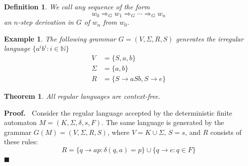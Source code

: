\documentclass[aps,pra,onecolumn,notitlepage,superscriptaddress]{revtex4-1}
\newcommand{\N}{\mathbb{N}}
\newtheorem{theo}{Theorem}
\newtheorem{defi}{Definition}
\newtheorem{exa}{Example}
\def\Proof{{\bf Proof.~}}
\def\qed{$\blacksquare$ \newline}
\begin{document}
    \begin{defi}
        We call any sequence of the form
        \begin{equation}
            w_0 \Rightarrow_G w_1 \Rightarrow_G \cdots \Rightarrow_G w_n
        \end{equation}
        an $n$-step derivation in $G$ of $w_n$ from $w_0$.
    \end{defi}

    \begin{exa}
        The following grammar $G = (V, \Sigma, R, S)$ generates the irregular language $\{a^ib^i : i \in \N\}$
        \begin{align*}
            V &= \{ S,a,b \} \\
            \Sigma &= \{a,b\} \\
            R &= \{ S \to aSb, S \to e \}
        \end{align*}
    \end{exa}

    \begin{theo}
        All regular languages are context-free.
    \end{theo}
    \Proof
    Consider the regular language accepted by the deterministic finite
    automaton $M = (K, \Sigma, \delta, s, F)$. The same language is generated by the grammar $G(M) = (V, \Sigma, R, S)$, where $V = K \cup \Sigma$, $S = s$, and $R$ consists of these rules:
    \begin{equation}
        R = \{ q \to ap : \delta(q,a)=p \} \cup \{ q \to e: q \in F \}
    \end{equation}
    \qed
\end{document}
